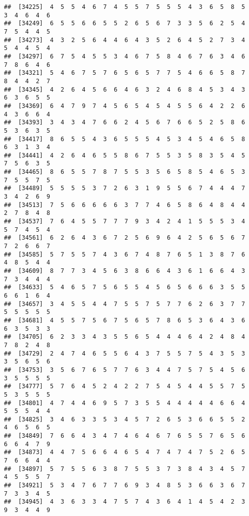 \documentclass[
]{book}
\begin{document}
\begin{verbatim}
##  [34225]  4  5  5  4  6  7  4  5  5  7  5  5  5  4  3  6  5  8  5  3  4  6  4  6
##  [34249]  6  5  5  6  6  5  5  2  6  5  6  7  3  3  5  6  2  5  4  7  5  4  4  5
##  [34273]  4  3  2  5  6  4  4  6  4  3  5  2  6  4  5  2  7  3  4  5  4  4  5  4
##  [34297]  6  7  5  4  5  5  3  4  6  7  5  8  4  6  7  6  3  4  6  7  8  6  4  6
##  [34321]  5  4  6  7  5  7  6  5  6  5  7  7  5  4  6  6  5  8  7  8  4  4  2  7
##  [34345]  4  2  6  4  5  6  6  4  6  3  2  4  6  8  4  5  3  4  3  6  3  6  5  5
##  [34369]  6  4  7  9  7  4  5  6  5  4  5  4  5  5  6  4  2  2  6  4  3  6  6  4
##  [34393]  3  4  3  4  7  6  6  2  4  5  6  7  6  6  5  2  5  8  6  5  3  6  3  5
##  [34417]  8  6  5  5  4  3  6  5  5  5  4  5  3  4  5  4  6  5  8  6  3  1  3  4
##  [34441]  4  2  6  4  6  5  5  8  6  7  5  5  3  5  8  3  5  4  5  7  5  6  3  5
##  [34465]  8  6  5  5  7  8  7  5  5  3  5  6  5  8  5  4  6  5  3  7  5  5  7  5
##  [34489]  5  5  5  5  3  7  2  6  3  1  9  5  5  6  7  4  4  4  7  3  4  2  6  9
##  [34513]  7  5  6  6  6  6  6  3  7  7  4  6  5  8  6  4  8  4  4  2  7  8  4  8
##  [34537]  7  6  4  5  5  7  7  7  9  3  4  2  4  1  5  5  5  3  4  5  7  4  5  4
##  [34561]  6  2  6  4  3  6  7  2  5  6  9  6  4  2  5  6  5  6  7  7  2  6  6  7
##  [34585]  5  7  5  5  7  4  3  6  7  4  8  7  6  5  1  3  8  7  6  4  8  5  4  4
##  [34609]  8  7  7  3  4  5  6  3  8  6  6  4  3  6  1  6  6  4  3  7  3  4  4  4
##  [34633]  5  4  6  5  7  5  6  5  5  4  5  6  5  6  6  6  3  5  5  6  6  1  6  4
##  [34657]  3  4  5  5  4  4  7  5  5  7  5  7  7  6  2  6  3  7  7  5  5  5  5  5
##  [34681]  4  5  5  7  5  6  7  5  6  5  7  8  6  5  3  6  4  3  6  6  3  5  3  3
##  [34705]  6  2  3  3  4  3  5  5  6  5  4  4  4  6  4  2  4  8  4  7  8  2  4  8
##  [34729]  2  4  7  4  6  5  5  6  4  3  7  5  5  7  5  4  3  5  3  3  5  6  5  6
##  [34753]  3  5  6  7  6  5  7  7  6  3  4  4  7  5  7  5  4  5  6  3  5  5  5  5
##  [34777]  5  7  6  4  5  2  4  2  2  7  5  4  5  4  4  5  5  7  5  5  3  5  5  5
##  [34801]  4  7  4  4  6  9  5  7  3  5  5  4  4  4  4  4  6  6  4  5  5  5  4  4
##  [34825]  3  4  6  3  3  5  3  4  5  7  2  6  5  3  6  6  5  5  2  4  6  5  6  5
##  [34849]  7  6  6  4  3  4  7  4  6  4  6  7  6  5  5  7  6  5  6  6  6  4  7  9
##  [34873]  4  4  7  5  6  6  4  6  5  4  7  4  7  4  7  5  2  6  5  7  6  6  4  4
##  [34897]  5  7  5  5  6  3  8  7  5  5  3  7  3  8  4  3  4  5  7  4  5  5  5  7
##  [34921]  5  3  4  7  6  7  7  6  9  3  4  8  5  3  6  6  3  6  7  7  3  3  4  5
##  [34945]  4  3  6  3  3  4  7  5  7  4  3  6  4  1  4  5  4  2  3  9  3  4  4  9

\end{verbatim}
\end{document}
